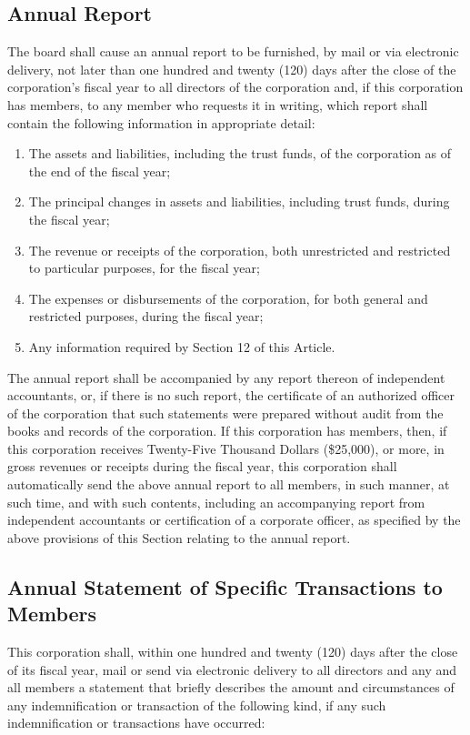 \documentclass{article}
\begin{document}
	\subsection{Annual Report}
	The board shall cause an annual report to be furnished, by mail or via electronic delivery, not later than one hundred and twenty (120) days after the close of the corporation’s fiscal year to all directors of the corporation and, if this corporation has members, to any member who requests it in writing, which report shall contain the following information in appropriate detail:
	\begin{enumerate}[\indent (a)]
		\item The assets and liabilities, including the trust funds, of the corporation as of the end of the fiscal year;
		\item The principal changes in assets and liabilities, including trust funds, during the fiscal year;
		\item The revenue or receipts of the corporation, both unrestricted and restricted to particular purposes, for the fiscal year;
		\item The expenses or disbursements of the corporation, for both general and restricted purposes, during the fiscal year;
		\item Any information required by Section 12 of this Article.
	\end{enumerate}
	The annual report shall be accompanied by any report thereon of independent accountants, or, if there is no such report, the certificate of an authorized officer of the corporation that such statements were prepared without audit from the books and records of the corporation.
	If this corporation has members, then, if this corporation receives Twenty-Five Thousand Dollars (\$25,000), or more, in gross revenues or receipts during the fiscal year, this corporation shall automatically send the above annual report to all members, in such manner, at such time, and with such contents, including an accompanying report from independent accountants or certification of a corporate officer, as specified by the above provisions of this Section relating to the annual report.
	
	\subsection{Annual Statement of Specific Transactions to Members}
	This corporation shall, within one hundred and twenty (120) days after the close of its fiscal year, mail or send via electronic delivery to all directors and any and all members a statement that briefly describes the amount and circumstances of any indemnification or transaction of the following kind, if any such indemnification or transactions have occurred:
	
\end{document}
